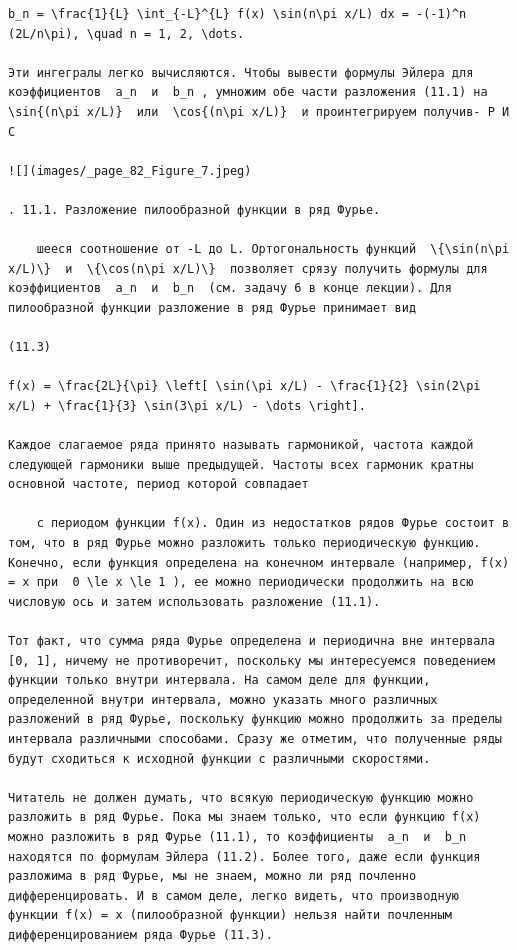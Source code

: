 \documentclass[
  ukrainian,
]{article}
\begin{document}
\begin{verbatim}
b_n = \frac{1}{L} \int_{-L}^{L} f(x) \sin(n\pi x/L) dx = -(-1)^n (2L/n\pi), \quad n = 1, 2, \dots.

Эти ингегралы легко вычисляются. Чтобы вывести формулы Эйлера для коэффициентов  a_n  и  b_n , умножим обе части разложения (11.1) на  \sin{(n\pi x/L)}  или  \cos{(n\pi x/L)}  и проинтегрируем получив- Р И С

![](images/_page_82_Figure_7.jpeg)

. 11.1. Разложение пилообразной функции в ряд Фурье.

    шееся соотношение от -L до L. Ортогональность функций  \{\sin(n\pi x/L)\}  и  \{\cos(n\pi x/L)\}  позволяет срязу получить формулы для коэффициентов  a_n  и  b_n  (см. задачу 6 в конце лекции). Для пилообразной функции разложение в ряд Фурье принимает вид

(11.3)

f(x) = \frac{2L}{\pi} \left[ \sin(\pi x/L) - \frac{1}{2} \sin(2\pi x/L) + \frac{1}{3} \sin(3\pi x/L) - \dots \right].

Каждое слагаемое ряда принято называть гармоникой, частота каждой следующей гармоники выше предыдущей. Частоты всех гармоник кратны основной частоте, период которой совпадает

    с периодом функции f(x). Один из недостатков рядов Фурье состоит в том, что в ряд Фурье можно разложить только периодическую функцию. Конечно, если функция определена на конечном интервале (например, f(x) = x при  0 \le x \le 1 ), ее можно периодически продолжить на всю числовую ось и затем использовать разложение (11.1).

Тот факт, что сумма ряда Фурье определена и периодична вне интервала [0, 1], ничему не противоречит, поскольку мы интересуемся поведением функции только внутри интервала. На самом деле для функции, определенной внутри интервала, можно указать много различных разложений в ряд Фурье, поскольку функцию можно продолжить за пределы интервала различными способами. Сразу же отметим, что полученные ряды будут сходиться к исходной функции с различными скоростями.

Читатель не должен думать, что всякую периодическую функцию можно разложить в ряд Фурье. Пока мы знаем только, что если функцию f(x) можно разложить в ряд Фурье (11.1), то коэффициенты  a_n  и  b_n  находятся по формулам Эйлера (11.2). Более того, даже если функция разложима в ряд Фурье, мы не знаем, можно ли ряд почленно дифференцировать. И в самом деле, легко видеть, что производную функции f(x) = x (пилообразной функции) нельзя найти почленным дифференцированием ряда Фурье (11.3).


\end{verbatim}
\end{document}
